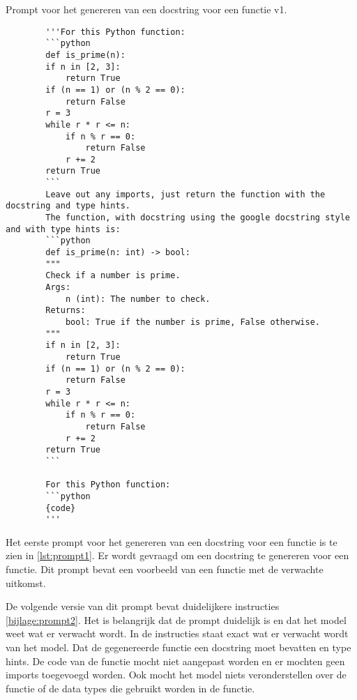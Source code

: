 \begin{listing}
    \caption{Prompt voor het genereren van een docstring voor een functie v1.}
    \label{lst:prompt1}
    \begin{verbatim}
        '''For this Python function:
        ```python	
        def is_prime(n):
        if n in [2, 3]:
            return True
        if (n == 1) or (n % 2 == 0):
            return False
        r = 3
        while r * r <= n:
            if n % r == 0:
                return False
            r += 2
        return True
        ```
        Leave out any imports, just return the function with the docstring and type hints.
        The function, with docstring using the google docstring style and with type hints is:
        ```python	
        def is_prime(n: int) -> bool:
        """
        Check if a number is prime.
        Args:
            n (int): The number to check.
        Returns:
            bool: True if the number is prime, False otherwise.
        """
        if n in [2, 3]:
            return True
        if (n == 1) or (n % 2 == 0):
            return False
        r = 3
        while r * r <= n:
            if n % r == 0:
                return False
            r += 2
        return True
        ```
        
        For this Python function:
        ```python	
        {code}
        '''
    \end{verbatim}
\end{listing}

Het eerste prompt voor het genereren van een docstring voor een functie is te zien in \ref{lst:prompt1}.
Er wordt gevraagd om een docstring te genereren voor een functie. Dit prompt bevat een voorbeeld van een functie met de verwachte uitkomst. 

De volgende versie van dit prompt bevat duidelijkere instructies \ref{bijlage:prompt2}.
Het is belangrijk dat de prompt duidelijk is en dat het model weet wat er verwacht wordt. 
In de instructies staat exact wat er verwacht wordt van het model. Dat de gegenereerde functie een docstring moet bevatten en type hints.
De code van de functie mocht niet aangepast worden en er mochten geen imports toegevoegd worden.
Ook mocht het model niets veronderstellen over de functie of de data types die gebruikt worden in de functie.

